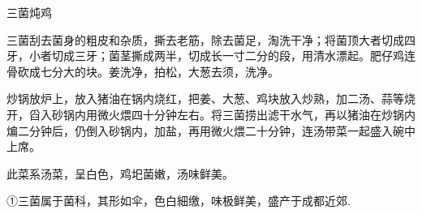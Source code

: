 \begin{recipe}{三菌炖鸡}

\ingredients


\cooking

\step 三菌刮去菌身的粗皮和杂质，撕去老筋，除去菌足，淘洗干净；将菌顶大者切成四牙，小者切成三牙；菌茎撕成两半，切成长一寸二分的段，用清水漂起。肥仔鸡连骨砍成七分大的块。姜洗净，拍松，大葱去须，洗净。

\step 炒锅放炉上，放入猪油在锅内烧红，把姜、大葱、鸡块放入炒熟，加二汤、蒜等烧开，舀入砂锅内用微火煨四十分钟左右。将三菌捞出滤干水气，再以猪油在炒锅内煸二分钟后，仍倒入砂锅内，加盐，再用微火煨二十分钟，连汤带菜一起盛入碗中上席。

\notes

此菜系汤菜，呈白色，鸡圯菌嫩，汤味鲜美。

①三菌属于菌科，其形如伞，色白細缴，味极鲜美，盛产于成都近郊.

\end{recipe}

